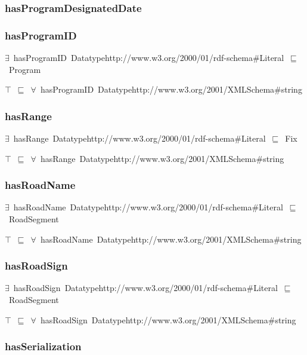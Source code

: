 \documentclass{article}
\begin{document}
\subsubsection*{hasProgramDesignatedDate}

\subsubsection*{hasProgramID}

\ensuremath{\exists}~hasProgramID~Datatypehttp://www.w3.org/2000/01/rdf-schema#Literal~\ensuremath{\sqsubseteq}~Program

\ensuremath{\top}~\ensuremath{\sqsubseteq}~\ensuremath{\forall}~hasProgramID~Datatypehttp://www.w3.org/2001/XMLSchema#string

\subsubsection*{hasRange}

\ensuremath{\exists}~hasRange~Datatypehttp://www.w3.org/2000/01/rdf-schema#Literal~\ensuremath{\sqsubseteq}~Fix

\ensuremath{\top}~\ensuremath{\sqsubseteq}~\ensuremath{\forall}~hasRange~Datatypehttp://www.w3.org/2001/XMLSchema#string

\subsubsection*{hasRoadName}

\ensuremath{\exists}~hasRoadName~Datatypehttp://www.w3.org/2000/01/rdf-schema#Literal~\ensuremath{\sqsubseteq}~RoadSegment

\ensuremath{\top}~\ensuremath{\sqsubseteq}~\ensuremath{\forall}~hasRoadName~Datatypehttp://www.w3.org/2001/XMLSchema#string

\subsubsection*{hasRoadSign}

\ensuremath{\exists}~hasRoadSign~Datatypehttp://www.w3.org/2000/01/rdf-schema#Literal~\ensuremath{\sqsubseteq}~RoadSegment

\ensuremath{\top}~\ensuremath{\sqsubseteq}~\ensuremath{\forall}~hasRoadSign~Datatypehttp://www.w3.org/2001/XMLSchema#string

\subsubsection*{hasSerialization}
\end{document}
